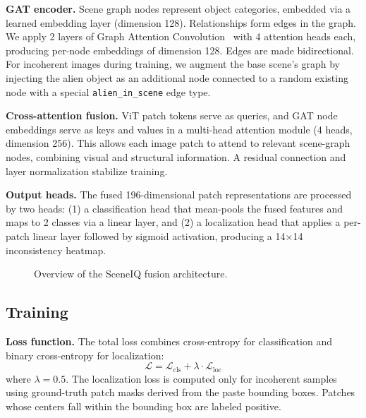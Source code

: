 \documentclass[conference]{IEEEtran}
\begin{document}
\textbf{GAT encoder.} Scene graph nodes represent object categories, embedded via a learned embedding layer (dimension 128). Relationships form edges in the graph. We apply 2 layers of Graph Attention Convolution~\cite{velickovic2018graph} with 4 attention heads each, producing per-node embeddings of dimension 128. Edges are made bidirectional. For incoherent images during training, we augment the base scene's graph by injecting the alien object as an additional node connected to a random existing node with a special \texttt{alien\_in\_scene} edge type.

\textbf{Cross-attention fusion.} ViT patch tokens serve as queries, and GAT node embeddings serve as keys and values in a multi-head attention module (4 heads, dimension 256). This allows each image patch to attend to relevant scene-graph nodes, combining visual and structural information. A residual connection and layer normalization stabilize training.

\textbf{Output heads.} The fused 196-dimensional patch representations are processed by two heads: (1) a classification head that mean-pools the fused features and maps to 2 classes via a linear layer, and (2) a localization head that applies a per-patch linear layer followed by sigmoid activation, producing a 14$\times$14 inconsistency heatmap.

\begin{figure}[t]
\centering
{}
\caption{Overview of the SceneIQ fusion architecture.}
\label{fig:architecture}
\end{figure}

\subsection{Training}

\textbf{Loss function.} The total loss combines cross-entropy for classification and binary cross-entropy for localization:
\begin{equation}
\mathcal{L} = \mathcal{L}_{\text{cls}} + \lambda \cdot \mathcal{L}_{\text{loc}}
\end{equation}
where $\lambda = 0.5$. The localization loss is computed only for incoherent samples using ground-truth patch masks derived from the paste bounding boxes. Patches whose centers fall within the bounding box are labeled positive.
\end{document}
